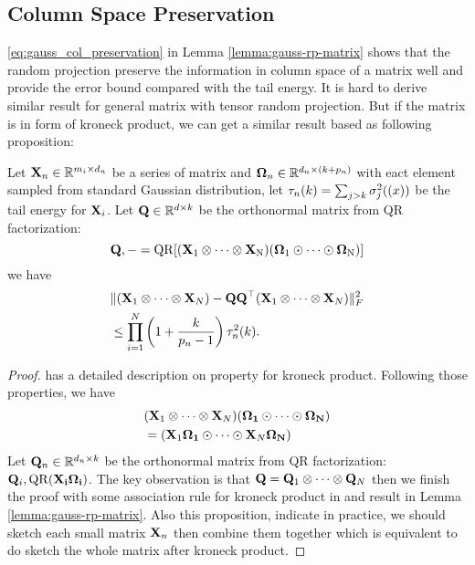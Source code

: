 \subsection{Column Space Preservation}
\eqref{eq:gauss_col_preservation} in Lemma \ref{lemma:gauss-rp-matrix} shows that the random projection preserve the information in column space of a matrix well and provide the error bound compared with the tail energy. It is hard to derive similar result for general matrix with tensor random projection. But if the matrix is in form of kroneck product, we can get a similar result based as following proposition:
\begin{prop}
Let $\mathbf{X}_n\in \mathbb{R}^{m_i\times d_n}$ be a series of matrix and $\mathbf{\Omega}_n\in \mathbb{R}^{d_n\times (k+p_n)}$ with eact element sampled from standard Gaussian distribution, let  $\tau_n(k) = \sum_{j>k} \sigma^2_j(\mathbf{(}x))$ be the tail energy for $\mathbf{X}_i$. Let $\mathbf{Q}\in \mathbb{R}^{d\times k}$ be the orthonormal matrix from QR factorization: 
\[
\mathbf{Q}, - = \rm{QR} [(\mathbf{X}_1\otimes \cdots \otimes \mathbf{X}_N)(\mathbf{\Omega}_1\odot \cdots \odot\mathbf{\Omega}_N)]
\]
we have
\begin{equation}
\begin{aligned}
&\| (\mathbf{X}_1\otimes \cdots \otimes \mathbf{X}_N) - \mathbf{QQ}^\top(\mathbf{X}_1\otimes \cdots \otimes \mathbf{X}_N)\|^2_F \\
& \le \prod_{i=1}^N  \left(1+\frac{k}{p_n-1}\right)\tau^2_n(k). 
\end{aligned}
\end{equation}
\end{prop}
\begin{proof}
\cite{schacke2013kronecker} has a detailed description on property for kroneck product. Following those properties, we have 
\begin{equation}
\begin{aligned}
& (\mathbf{X}_1\otimes \cdots \otimes \mathbf{X}_N)(\mathbf{\Omega_1} \odot \cdots \odot \mathbf{\Omega_N})  \\
& = ( \mathbf{X}_1\mathbf{\Omega_1}\odot \cdots \odot  \mathbf{X}_N\mathbf{\Omega_N})
\end{aligned}
\end{equation}
 Let $\mathbf{Q}_n\in \mathbb{R}^{d_n\times k}$ be the orthonormal matrix from QR factorization: $\mathbf{Q}_i, \rm{QR}(\mathbf{X_i\Omega_i})$. The key observation is that 
 $\mathbf{Q} = \mathbf{Q}_1\otimes \cdots \otimes \mathbf{Q}_N$ then we finish the proof with some association rule for kroneck product in \cite{schacke2013kronecker} and result in Lemma \ref{lemma:gauss-rp-matrix}.  Also this proposition, indicate in practice, we should sketch each small matrix $\mathbf{X}_n$ then combine them together which is equivalent to do sketch the whole matrix after kroneck product. 
 
\end{proof}





